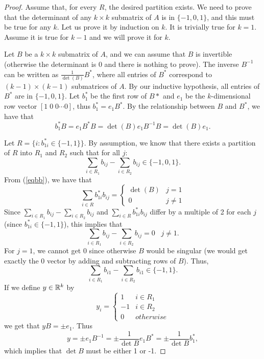 \documentclass[12pt]{article}
\begin{document}
\begin{proof}
Assume that, for every $R$, the desired partition exists. We need to prove
that the determinant of any $k\times k$ submatrix of $A$ is in
$\{-1,0,1\}$, and this must be true for any $k$. Let us prove it by
induction on $k$. It is trivially true for $k=1$. Assume it is true
for $k-1$ and we will prove it for $k$.

Let $B$ be a $k\times k$ submatrix of $A$, and we can assume that $B$
is invertible (otherwise the determinant is 0 and there is nothing to
prove). The inverse $B^{-1}$ can be written as $\frac{1}{\det(B)}
B^*$, where all entries of $B^*$ correspond to $(k-1)\times (k-1)$
submatrices of $A$. By our inductive hypothesis, all entries of $B^*$
are in $\{-1,0,1\}$. Let $b^*_1$ be the first row of $B*$ and $e_1$ be
the $k$-dimensional row vector $[1\; 0\; 0\cdots 0]$, thus $b^*_1=e_1
B^*$. By the relationship between $B$ and $B^*$, we have that 
\begin{equation} \label{eqbb}
b^*_1
B = e_1 B^* B = \det(B) e_1 B^{-1} B = \det(B) e_1.
\end{equation}

Let $R=\{i: b^*_{1i}\in \{-1,1\}\}$. By assumption, we know that there
exists a partition of $R$ into $R_1$ and $R_2$ such that for all $j$:
\begin{equation}
\label{eqbb2}
\sum_{i\in R_1} b_{ij} - \sum_{i\in R_2} b_{ij} \in\{-1,0,1\}.
\end{equation}
From (\ref{eqbb}), we have that  
\begin{equation}
\label{eqbb3}
\sum_{i\in R} b^*_{1i} b_{ij} =\left\{ \begin{array}{ll} \det(B) &
  j=1 \\ 0 & j\neq 1 \end{array} \right.
\end{equation}
Since $\sum_{i\in R_1} b_{ij} - \sum_{i\in R_2} b_{ij}$ and
$\sum_{i\in R} b^*_{1i} b_{ij}$ differ by a multiple of 2 for each $j$ (since
$b^*_{1i}\in\{-1,1\}$), this implies that  
\begin{equation}
\label{eqbb4}
\sum_{i\in R_1} b_{ij} - \sum_{i\in R_2} b_{ij} =0 \;\;\; j \neq 1.
\end{equation}
For $j=1$, we cannot get 0 since otherwise $B$ would be singular (we would get exactly the 0 vector by
adding and subtracting rows of $B$). Thus,
$$\sum_{i\in R_1} b_{i1} - \sum_{i\in R_2} b_{i1} \in\{-1,1\}.$$
If we define $y\in {\mathbb R}^k$ by 
$$y_i=\left\{\begin{array}{ll} 1 & i\in R_1 \\ -1 & i\in R_2 \\ 0 &
otherwise \end{array} \right.$$
we get that $yB=\pm e_1$. Thus $$y=\pm e_1 B^{-1} = \pm \frac{1}{\det
  B} e_1 B^*= \pm \frac{1}{\det B} b^*_1,$$ which implies that $\det
B$ must be either 1 or -1.
\end{proof} 
\end{document}
